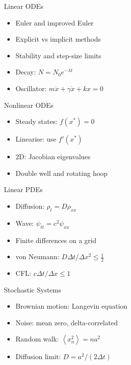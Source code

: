 \documentclass[10.5pt,a4paper]{article}
\newcommand{\avg}[1]{\left\langle #1 \right\rangle}
\begin{document}
\vspace{0.3em}
\noindent
\begin{minipage}[t]{0.487\textwidth}
\begin{overviewbox}[navy]{Linear ODEs}
\begin{itemize}
\item Euler and improved Euler
\item Explicit vs implicit methods
\item Stability and step-size limits
\item Decay: $N=N_0e^{-\lambda t}$
\item Oscillator: $m\ddot x+\gamma\dot x+kx=0$
\end{itemize}
\end{overviewbox}
\vspace{0.2em}
\begin{overviewbox}[navy]{Nonlinear ODEs}
\begin{itemize}
\item Steady states: $f(x^*)=0$
\item Linearise: use $f'(x^*)$
\item 2D: Jacobian eigenvalues
\item Double well and rotating hoop
\end{itemize}
\end{overviewbox}
\end{minipage}\hfill
\begin{minipage}[t]{0.487\textwidth}
\begin{overviewbox}[violet]{Linear PDEs}
\begin{itemize}
\item Diffusion: $\rho_t=D\rho_{xx}$
\item Wave: $\psi_{tt}=c^2\psi_{xx}$
\item Finite differences on a grid
\item von Neumann: $D\Delta t/\Delta x^2\le\frac12$
\item CFL: $c\Delta t/\Delta x\le1$
\end{itemize}
\end{overviewbox}
\vspace{0.2em}
\begin{overviewbox}[rust]{Stochastic Systems}
\begin{itemize}
\item Brownian motion: Langevin equation
\item Noise: mean zero, delta-correlated
\item Random walk: $\avg{x_n^2}=na^2$
\item Diffusion limit: $D=a^2/(2\Delta t)$
\end{itemize}
\end{overviewbox}
\end{minipage}
\end{document}
